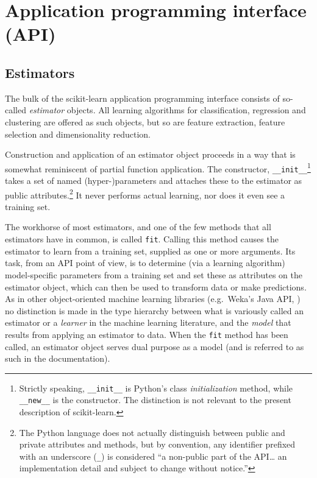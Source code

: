 \documentclass[a4paper]{article}
\begin{document}
\section{Application programming interface (API)}

\subsection{Estimators}


The bulk of the scikit-learn application programming interface
consists of so-called \textit{estimator} objects.
All learning algorithms for classification, regression and clustering
are offered as such objects,
but so are feature extraction, feature selection and dimensionality reduction.

Construction and application of an estimator object
proceeds in a way that is somewhat reminiscent of partial function application.
The constructor, \texttt{\_\_init\_\_}\footnote{
  Strictly speaking, \texttt{\_\_init\_\_} is Python's
  class \textit{initialization} method,
  while \texttt{\_\_new\_\_} is the constructor.
  The distinction is not relevant to the present description of scikit-learn.}
takes a set of named (hyper-)parameters
and attaches these to the estimator as public attributes.\footnote{
  The Python language does not actually distinguish between public and private
  attributes and methods,
  but by convention, any identifier prefixed with an underscore (\texttt{\_})
  is considered ``a non-public part of the API\ldots
  an implementation detail and subject to change without notice.''
  }
It never performs actual learning, nor does it even see a training set.

The workhorse of most estimators, and one of the few methods
that all estimators have in common, is called \texttt{fit}.
Calling this method causes the estimator to learn from a training set,
supplied as one or more arguments.
Its task, from an API point of view,
is to determine (via a learning algorithm) model-specific parameters
from a training set and set these as attributes on the estimator object,
which can then be used to transform data or make predictions.
As in other object-oriented machine learning libraries
(e.g.\ Weka's Java API, \citealp{hall2009weka})
no distinction is made in the type hierarchy
between what is variously called an estimator or a \textit{learner}
in the machine learning literature,
and the \textit{model} that results from applying an estimator to data.
When the \texttt{fit} method has been called,
an estimator object serves dual purpose as a model
(and is referred to as such in the documentation).
\end{document}
